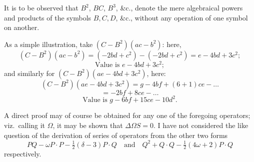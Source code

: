 \documentclass[11pt]{article}
\begin{document}
It is to be observed that $B^2$, $BC$, $B^3$, \&c., denote the mere algebraical powers and products of the symbols $B, C, D$, \&c., without any operation of one symbol on another.

As a simple illustration, take $(C - B^2)(ac - b^2)$: here,
\[
(C - B^2)(ac - b^2) = (-2bd + c^2) - (-2bd + c^2) = e - 4bd + 3c^2;
\]
\[
\text{Value is } e - 4bd + 3c^2;
\]
and similarly for $(C - B^2)(ae - 4bd + 3c^2)$, here:
\[
(C - B^2)(ae - 4bd + 3c^2) = g - 4bf + (6 + 1) ce - \ldots
\]
\[
= -2bf + 8ce - \ldots
\]
\[
\text{Value is } g - 6bf + 15ce - 10d^2.
\]

A direct proof may of course be obtained for any one of the foregoing operators; viz.\ calling it $\Omega$, it may be shown that $\Delta \Omega S = 0$. I have not considered the like question of the derivation of series of operators from the other two forms
\[
PQ - \omega P \cdot P - \tfrac{1}{2}(\delta - 3) P \cdot Q\quad \text{and}\quad Q^2 + Q \cdot Q - \tfrac{1}{2}(4\omega + 2) P \cdot Q
\]
respectively.
\end{document}
